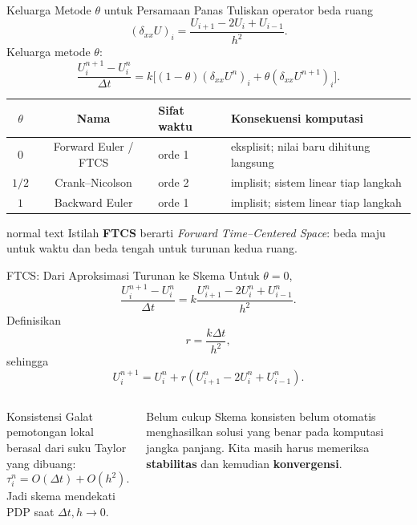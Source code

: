 \documentclass[aspectratio=169,10pt]{beamer}
\begin{document}
\begin{frame}{Keluarga Metode $\theta$ untuk Persamaan Panas}
\small
Tuliskan operator beda ruang
\[
(\delta_{xx}U)_i=\frac{U_{i+1}-2U_i+U_{i-1}}{h^2}.
\]
Keluarga metode $\theta$:
\[
\boxed{
\frac{U_i^{n+1}-U_i^n}{\Delta t}
=k\Big[(1-\theta)(\delta_{xx}U^n)_i+\theta(\delta_{xx}U^{n+1})_i\Big].}
\]
\begin{center}
\begin{tabular}{ccll}
\toprule
$\theta$ & Nama & Sifat waktu & Konsekuensi komputasi\\
\midrule
$0$ & Forward Euler / FTCS & orde 1 & eksplisit; nilai baru dihitung langsung\\
$1/2$ & Crank--Nicolson & orde 2 & implisit; sistem linear tiap langkah\\
$1$ & Backward Euler & orde 1 & implisit; sistem linear tiap langkah\\
\bottomrule
\end{tabular}
\end{center}
\begin{beamercolorbox}[sep=.12cm,wd=\textwidth]{normal text}
\centering
Istilah \textbf{FTCS} berarti \emph{Forward Time--Centered Space}: beda maju untuk waktu dan beda tengah untuk turunan kedua ruang.
\end{beamercolorbox}
\end{frame}

\begin{frame}{FTCS: Dari Aproksimasi Turunan ke Skema}
\small
Untuk $\theta=0$,
\[
\frac{U_i^{n+1}-U_i^n}{\Delta t}
=k\frac{U_{i+1}^n-2U_i^n+U_{i-1}^n}{h^2}.
\]
Definisikan
\[
\boxed{r=\frac{k\Delta t}{h^2}},
\]
sehingga
\[
\boxed{U_i^{n+1}=U_i^n+r(U_{i+1}^n-2U_i^n+U_{i-1}^n)}.
\]
\begin{columns}[T,onlytextwidth]
\begin{block}{Konsistensi}
Galat pemotongan lokal berasal dari suku Taylor yang dibuang:
\[
\tau_i^n=O(\Delta t)+O(h^2).
\]
Jadi skema mendekati PDP saat $\Delta t,h\to0$.
\end{block}
\begin{block}{Belum cukup}
Skema konsisten belum otomatis menghasilkan solusi yang benar pada komputasi jangka panjang. Kita masih harus memeriksa \textbf{stabilitas} dan kemudian \textbf{konvergensi}.
\end{block}
\end{columns}
\end{frame}
\end{document}
